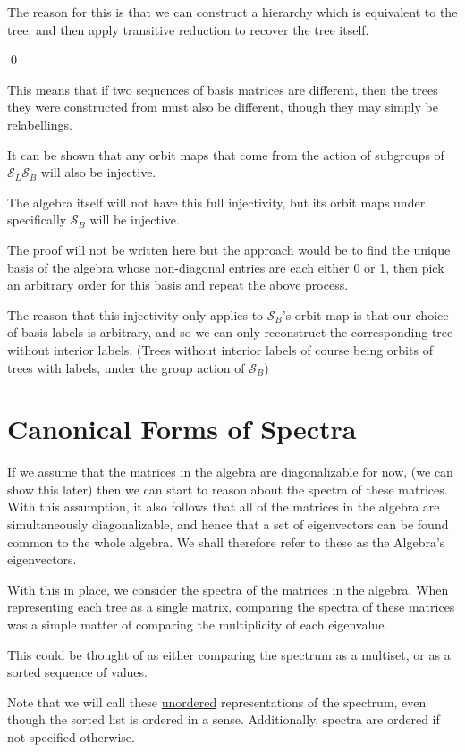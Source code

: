 \documentclass[10pt,a4paper]{report}
\newcommand{\S}{\mathcal{S}}
\begin{document}
The reason for this is that we can construct a hierarchy which is equivalent to the tree, and then apply transitive reduction to recover the tree itself.

\qed

This means that if two sequences of basis matrices are different, then the trees they were constructed from must also be different, though they may simply be relabellings.

It can be shown that any orbit maps that come from the action of subgroups of $\S_L\S_B$ will also be injective.

The algebra itself will not have this full injectivity, but its orbit maps under specifically $\S_B$ will be injective.

The proof will not be written here but the approach would be to find the unique basis of the algebra whose non-diagonal entries are each either 0 or 1, then pick an arbitrary order for this basis and repeat the above process.

The reason that this injectivity only applies to $\S_B$'s orbit map is that our choice of basis labels is arbitrary, and so we can only reconstruct the corresponding tree without interior labels. (Trees without interior labels of course being orbits of trees with labels, under the group action of $\S_B$)

\section{Canonical Forms of Spectra}

If we assume that the matrices in the algebra are diagonalizable for now, (we
can show this later) then we can start to reason about the spectra of these
matrices.
With this assumption, it also follows that all of the matrices in the
algebra are simultaneously diagonalizable, and hence that a set of eigenvectors
can be found common to the whole algebra.
We shall therefore refer to these as the Algebra's eigenvectors.

With this in place, we consider the spectra of the matrices in the algebra.
When representing each tree as a single matrix, comparing the spectra of these
matrices was a simple matter of comparing the multiplicity of each eigenvalue.

This could be thought of as either comparing the spectrum as a multiset, or as
a sorted sequence of values.

Note that we will call these \underline{unordered} representations of the spectrum, even though the sorted list is ordered in a sense. Additionally, spectra are ordered if not specified otherwise.
\end{document}
